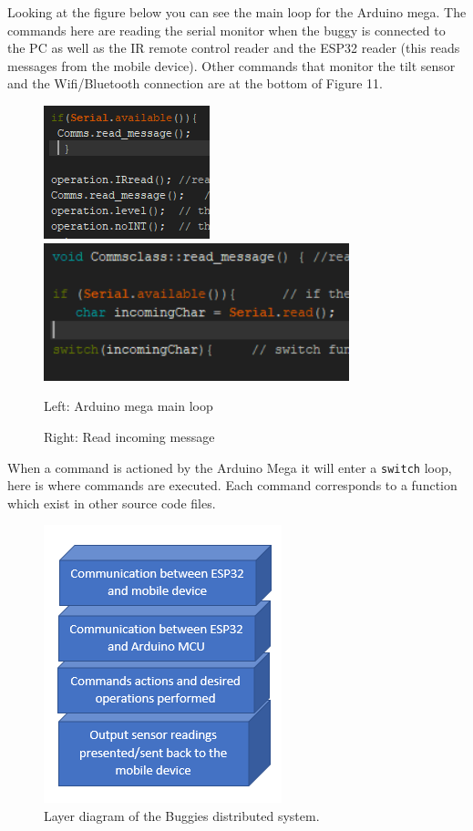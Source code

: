 \documentclass[8pt, a4paper]{article}
\begin{document}
Looking at the figure below you can see the main loop for the Arduino mega. The commands here are reading the serial monitor when the buggy is connected to the PC as well as the IR remote control reader and the ESP32 reader (this reads messages from the mobile device). Other commands that monitor the tilt sensor and the Wifi/Bluetooth connection are at the bottom of Figure 11. 

\begin{figure}[H]
\centering
\includegraphics[]{main_loop}
\includegraphics[height=4cm]{read_message}
\caption{Left: Arduino mega main loop}
\caption{Right: Read incoming message}
\end{figure}

When a command is actioned by the Arduino Mega it will enter a \verb|switch| loop, here is where commands are executed. Each command corresponds to a function which exist in other source code files.

\begin{figure}[H]
	\centering
	\includegraphics[]{layer}
	\caption{Layer diagram of the Buggies distributed system.}

\end{figure}
\end{document}
